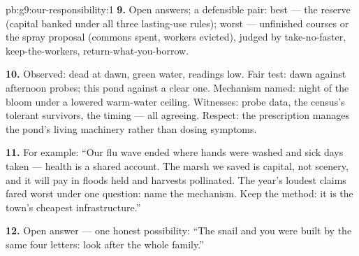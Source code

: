 \begin{solution}{pb:g9:our-responsibility:1}
\textbf{9.} Open answers; a defensible pair: best ---
the reserve (capital banked under all three lasting-use
rules); worst --- unfinished courses or the spray
proposal (commons spent, workers evicted), judged by
take-no-faster, keep-the-workers, return-what-you-borrow.

\textbf{10.} Observed: dead  at dawn, green water,
readings low. Fair test: dawn against afternoon probes;
this pond against a clear one. Mechanism named: night
 of the bloom under a lowered warm-water
ceiling. Witnesses: probe data, the census's tolerant
survivors, the timing --- all agreeing. Respect: the
prescription manages the pond's living machinery rather
than dosing symptoms.

\textbf{11.} For example: ``Our flu wave ended where
hands were washed and sick days taken --- health is a
shared account. The marsh we saved is capital, not
scenery, and it will pay in floods held and harvests
pollinated. The year's loudest claims fared worst under
one question: name the mechanism. Keep the method: it
is the town's cheapest infrastructure.''

\textbf{12.} Open answer --- one honest possibility:
``The snail and you were built by the same four
letters: look after the whole family.''
\end{solution}
